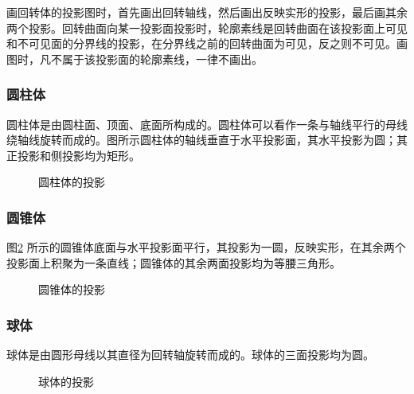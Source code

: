 画回转体的投影图时，首先画出回转轴线，然后画出反映实形的投影，最后画其余两个投影。回转曲面向某一投影面投影时，轮廓素线是回转曲面在该投影面上可见和不可见面的分界线的投影，在分界线之前的回转曲面为可见，反之则不可见。画图时，凡不属于该投影面的轮廓素线，一律不画出。
\subsubsection{圆柱体}
圆柱体是由圆柱面、顶面、底面所构成的。圆柱体可以看作一条与轴线平行的母线绕轴线旋转而成的。图所示圆柱体的轴线垂直于水平投影面，其水平投影为圆；其正投影和侧投影均为矩形。
\begin{figure}[htbp]
\centering
{}\hspace{30pt}
\caption{圆柱体的投影}\label{fig:yuanzhuti}
\end{figure}
\subsubsection{圆锥体}
图\ref{fig:yuanzhuiti} 所示的圆锥体底面与水平投影面平行，其投影为一圆，反映实形，在其余两个投影面上积聚为一条直线；圆锥体的其余两面投影均为等腰三角形。
\begin{figure}[htbp]
\centering
{}\hspace{30pt}
\caption{圆锥体的投影}\label{fig:yuanzhuiti}
\end{figure}
\subsubsection{球体}
球体是由圆形母线以其直径为回转轴旋转而成的。球体的三面投影均为圆。
\begin{figure}[htbp]
\centering
{}\hspace{30pt}
\caption{球体的投影}\label{fig:qiout}
\end{figure}

\endinput